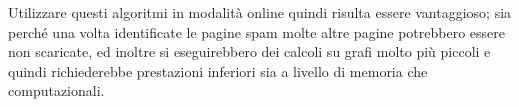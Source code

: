 Utilizzare questi algoritmi in modalità online quindi risulta essere vantaggioso; sia perché una volta identificate le pagine spam molte altre pagine potrebbero essere non scaricate, ed inoltre si eseguirebbero dei calcoli su grafi molto più piccoli e quindi richiederebbe prestazioni inferiori sia a livello di memoria che computazionali.



